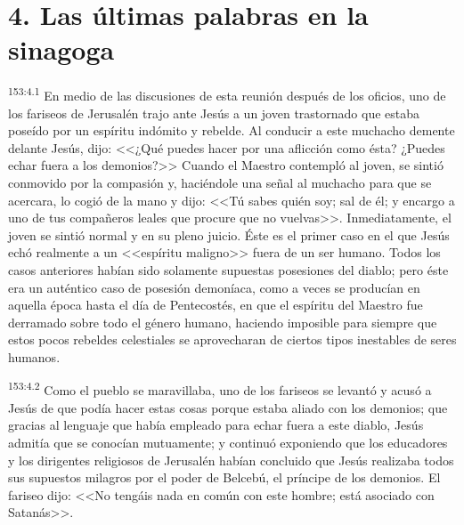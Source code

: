 \section*{4. Las últimas palabras en la sinagoga}
\par 
\textsuperscript{153:4.1} En medio de las discusiones de esta reunión después de los oficios, uno de los fariseos de Jerusalén trajo ante Jesús a un joven trastornado que estaba poseído por un espíritu indómito y rebelde. Al conducir a este muchacho demente delante Jesús, dijo: <<¿Qué puedes hacer por una aflicción como ésta? ¿Puedes echar fuera a los demonios?>> Cuando el Maestro contempló al joven, se sintió conmovido por la compasión y, haciéndole una señal al muchacho para que se acercara, lo cogió de la mano y dijo: <<Tú sabes quién soy; sal de él; y encargo a uno de tus compañeros leales que procure que no vuelvas>>. Inmediatamente, el joven se sintió normal y en su pleno juicio. Éste es el primer caso en el que Jesús echó realmente a un <<espíritu maligno>> fuera de un ser humano. Todos los casos anteriores habían sido solamente supuestas posesiones del diablo; pero éste era un auténtico caso de posesión demoníaca, como a veces se producían en aquella época hasta el día de Pentecostés, en que el espíritu del Maestro fue derramado sobre todo el género humano, haciendo imposible para siempre que estos pocos rebeldes celestiales se aprovecharan de ciertos tipos inestables de seres humanos.

\par 
\textsuperscript{153:4.2} Como el pueblo se maravillaba, uno de los fariseos se levantó y acusó a Jesús de que podía hacer estas cosas porque estaba aliado con los demonios; que gracias al lenguaje que había empleado para echar fuera a este diablo, Jesús admitía que se conocían mutuamente; y continuó exponiendo que los educadores y los dirigentes religiosos de Jerusalén habían concluido que Jesús realizaba todos sus supuestos milagros por el poder de Belcebú, el príncipe de los demonios. El fariseo dijo: <<No tengáis nada en común con este hombre; está asociado con Satanás>>.


